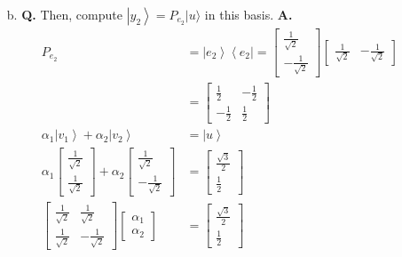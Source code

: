 \documentclass[main.tex]{subfiles}
\begin{document}
\begin{enumerate}
\begin{enumerate}
        \item[b.] \textbf{Q.} Then, compute $\left|y_{2}\right\rangle=P_{e_{2}}|u\rangle$ in this basis. \textbf{A.}
        \begin{align*}
            P_{e_2}                                                                     & = \left|e_{2}\right\rangle \left\langle e_{2} \right| 
                                                                                        = \left[\begin{array}{l} \frac{1}{\sqrt{2}} \\ -\frac{1}{\sqrt{2}} \end{array}\right] \left[\begin{array}{ll} \frac{1}{\sqrt{2}} & -\frac{1}{\sqrt{2}} \end{array}\right]\\
                                                                                        & = \left[\begin{array}{ll} \frac{1}{2} & -\frac{1}{2} \\ -\frac{1}{2} & \frac{1}{2} \end{array}\right] \\
            \alpha_{1}\left|v_{1}\right\rangle+\alpha_{2}\left|v_{2}\right\rangle       & = \left|u\right\rangle\\
            \alpha_{1} \left[\begin{array}{l} \frac{1}{\sqrt{2}} 
            \\ \frac{1}{\sqrt{2}} \end{array}\right]
            + \alpha_{2} \left[\begin{array}{l} \frac{1}{\sqrt{2}} 
            \\ -\frac{1}{\sqrt{2}} \end{array}\right]                                   & = \left[\begin{array}{c} \frac{\sqrt{3}}{2} \\ \frac{1}{2} \end{array}\right] \\
            \left[\begin{array}{ll} \frac{1}{\sqrt{2}} & \frac{1}{\sqrt{2}} 
            \\ \frac{1}{\sqrt{2}} & -\frac{1}{\sqrt{2}} \end{array}\right]
            \left[\begin{array}{c} \alpha_{1} \\ \alpha_{2} \end{array}\right]          & = \left[\begin{array}{c} \frac{\sqrt{3}}{2} \\ \frac{1}{2} \end{array}\right] \tag{matrix is unitary, inverse is the adjoint} \\

\end{align*}
\end{enumerate}
\end{enumerate}
\end{document}
